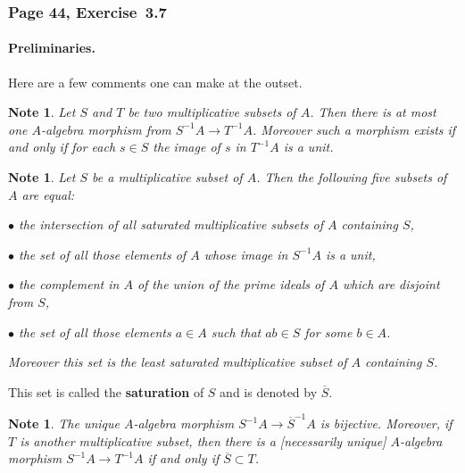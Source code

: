 \documentclass[12pt,letterpaper]{article}%
\newcommand{\nn}{\noindent}
\newtheorem{note}[thm]{Note}
\begin{document}
\subsubsection{Page 44, Exercise~3.7}%

\paragraph{Preliminaries.}\label{satprel}

Here are a few comments one can make at the outset.

\begin{note}
Let $S$ and $T$ be two multiplicative subsets of $A$. Then there is at most one $A$-algebra morphism from $S^{-1}A\to T^{-1}A$. Moreover such a morphism exists if and only if for each $s\in S$ the image of $s$ in $T^{-1}A$ is a unit.
\end{note}

\begin{note}
Let $S$ be a multiplicative subset of $A$. Then the following five subsets of $A$ are equal:

\nn$\bullet$ the intersection of all saturated multiplicative subsets of $A$ containing $S$,

\nn$\bullet$ the set of all those elements of $A$ whose image in $S^{-1}A$ is a unit,

\nn$\bullet$ the complement in $A$ of the union of the prime ideals of $A$ which are disjoint from $S$,

\nn$\bullet$ the set of all those elements $a\in A$ such that $ab\in S$ for some $b\in A$.

\nn Moreover this set is the least saturated multiplicative subset of $A$ containing $S$.
\end{note}

This set is called the \textbf{saturation} of $S$ and is denoted by $\overline S$.

\begin{note}
The unique $A$-algebra morphism $S^{-1}A\to\overline S^{-1}A$ is bijective. Moreover, if $T$ is another multiplicative subset, then there is a [necessarily unique] $A$-algebra morphism $S^{-1}A\to T^{-1}A$ if and only if $\overline S\subset T$.
\end{note}
\end{document}
